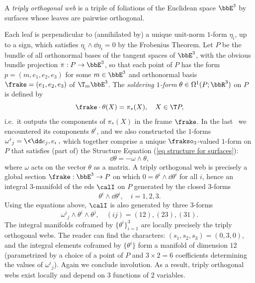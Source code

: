 \begin{example}
    A \emph{triply orthogonal web} is a triple of foliations of the Euclidean space $\bbE^3$ by surfaces whose leaves are pairwise orthogonal. 

    Each leaf is perpendicular to (annihilated by) a unique unit-norm $1$-form $\eta_i$, up to a sign, which satisfies $\eta_i\wedge\dd\eta_i=0$ by the Frobenius Theorem. Let $P$ be the bundle of all orthonormal bases of the tangent spaces of $\bbE^3$, with the obvious bundle projection $\pi:P\to \bbE^3$, so that each point of $P$ has the form $p=(m,e_1,e_2,e_3)$ for some $m\in \bbE^3$ and orthonormal basis $\frake=(e_1,e_2,e_3)$ of $\T_{m}\bbE^3$. The \emph{soldering $1$-form} $\theta\in \Omega^1(P;\bbR^3)$ on $P$ is defined by 
    \[\frake\cdot \theta(X)=\pi_\ast(X),\quad X\in \T P,\]
    i.e.\ it outputs the components of $\pi_\ast(X)$ in the frame $\frake$. In the last \subsect\ we encountered its components $\theta^i$, and we also constructed the $1$-forms 
    $\omega^i{}_j=\<\dd e_j,e_i\>,$
    which together comprise a unique $\frakso_3$-valued $1$-form on $P$ that satisfies (part of) the Structure Equation (\ref{eq structure for surfaces}):
    \[\dd \theta=-\omega\wedge\theta,\]
    where $\omega$ acts on the vector $\theta$ as a matrix. A triply orthogonal web is precisely a global section $\frake:\bbE^3\to P$  on which $0=\theta^i\wedge \dd\theta^i$ for all $i$, hence an integral $3$-manifold of the \gls{eds} $\calI$ on $P$ generated by the closed $3$-forms 
    \[\theta^i\wedge\dd\theta^i,\quad i=1,2,3.\]
    Using the equations above, $\calI$ is also generated by three $3$-forms
    \[\omega^i{}_j\wedge\theta^i\wedge\theta^j,\quad (ij)=(12),(23),(31).\]
    The integral manifolds coframed by $\{\theta^i\}_{i=1}^3$ are locally precisely the triply orthogonal webs. The reader can find the characters: $(s_1,s_2,s_3)=(0,3,0)$, and the integral elements coframed by $\{\theta^i\}$ form a manifold of dimension $12$ (parametrized by a choice of a point of $P$ and $3\times 2=6$ coefficients determining the values of $\omega^i{}_j$). Again we conclude involution. As a result, triply orthogonal webs exist locally and depend on $3$ functions of $2$ variables.
\end{example}

